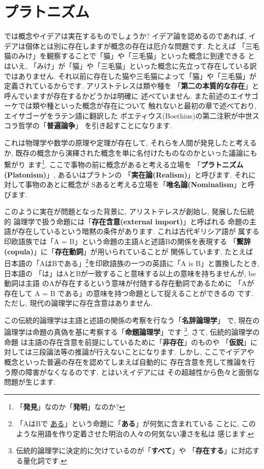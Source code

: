 \section{プラトニズム}


では概念やイデアは実在するものでしょうか? イデア論を認めるのであれば,
 イデアは個体とは別に存在しますが概念の存在は厄介な問題です. たとえば
「三毛猫のみけ」を観察することで「猫」や「三毛猫」といった概念に到達できる
とはいえ, 「みけ」が「猫」や「三毛猫」といった概念に先立って存在している訳
ではありません. それ以前に存在した猫や三毛猫によって「猫」や「三毛猫」が
定義されているからです. アリストテレスは類や種を
「\textbf{第二の本質的な存在}」と呼んでいますが存在するかどうかは明確に
述べていません. また前述のエイサゴーケでは類や種といった概念が存在について
触れないと最初の章で述べており, エイサゴーゲをラテン語に翻訳した
ボエティウス(Boethius)の第二注釈が中世スコラ哲学の「\textbf{普遍論争}」
を引き起すことになります\cite{普遍論争}.
\newline


これは物理学や数学の原理や定理が存在して, それらを人間が発見したと考えるか,
 既存の概念から演繹された概念を単に名付けたものなのかといった議論にも繋がり
ます\footnote{「\textbf{発見}」なのか「\textbf{発明}」なのか?}.
 ここで事物の前に概念があると考える立場を
「\textbf{プラトニズム(Platonism)}」, あるいはプラトンの
「\textbf{実在論(Realism)}」と呼びます. それに対して事物のあとに概念が
Sあると考える立場を「\textbf{唯名論(Nominalism}」と呼びます.
\newline


このように実在が問題となった背景に, アリストテレスが創始し, 発展した伝統的
論理学で扱う命題には「\textbf{存在含意(external import)}」と呼ばれる
命題の主語が存在しているという暗黙の条件があります. これは古代ギリシア語が
属する印欧語族では「A = B」という命題の主語Aと述語Bの関係を表現する
「\textbf{繋辞(copula)}」に「\textbf{存在動詞}」が用いられていることが
関係しています. たとえば日本語の「AはBである」\footnote{「AはBで
\underline{ある}」という命題に「\textbf{ある}」が何気に含まれている
ことに, このような用語を作り定着させた明治の人々の何気ない凄さを私は
感じます.}を印欧語族の一つの英語に「A is B」と置換したとき, 日本語の
「は」はAとBが一致すること意味する以上の意味を持ちませんが, be動詞は主語
のAが存在するという意味が付随する存在動詞であるために
「Aが存在して A = B である」の意味を持つ命題として捉えることができるの
です. ただし, 現代の論理学に存在含意はありません.
\newline 

この伝統的論理学は主語と述語の関係の考察を行なう「\textbf{名辞論理学}」
で, 現在の論理学は命題の真偽を基に考察する「\textbf{命題論理学}」です
\footnote{伝統的論理学に決定的に欠けているのが「\textbf{すべて}」や
「\textbf{存在する}」に対応する量化詞です.}. さて, 伝統的論理学の命題
は主語の存在含意を前提にしているために「\textbf{非存在}」のものや
「\textbf{仮説}」に対しては三段論法等の推論が行えないことになります.
 しかし, ここでイデアや概念といった普遍の存在を認めてしまえば自動的に
存在含意を充して推論を行う際の障害がなくなるのです. とはいえイデアには
その超越性から色々と面倒な問題が生じます.
\newline

